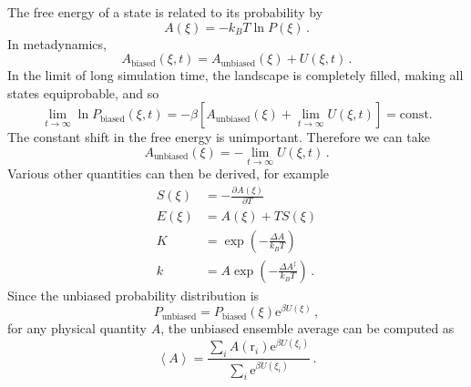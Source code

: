 \documentclass{article}
\theoremstyle{plain}\theoremheaderfont{\normalfont\itshape}\theorembodyfont{\rmfamily}\theoremseparator{.}\newtheorem*{rem}{Remark}\newtheorem*{ex}{Example}\newtheorem*{proof}{Proof}\newtheorem*{altp}{Alternative proof}
\theoremstyle{plain}\theoremheaderfont{\normalfont\bfseries}\theorembodyfont{\rmfamily}\theoremseparator{.}\newtheorem{thm}{Theorem}[section]\newtheorem{lem}[thm]{Lemma}\newtheorem{prop}[thm]{Proposition}\newtheorem*{cor}{Corollary}\newtheorem{defn}[thm]{Definition}\newtheorem{clm}[thm]{Claim}\newtheorem{clminproof}{Claim}\newtheorem{alg}[thm]{Algorithm}\newtheorem{hyp}[thm]{Hypothesis}\newtheorem{law}[thm]{Law}
\theoremstyle{break}\theoremheaderfont{\normalfont\itshape}\theorembodyfont{\rmfamily}\theoremseparator{.\medskip}\newtheorem*{proofskip}{Proof}\newtheorem*{exs}{Examples}\newtheorem*{rems}{Remarks}
\theoremstyle{break}\theoremheaderfont{\normalfont\bfseries}\theorembodyfont{\rmfamily}\theoremseparator{.\medskip}\newtheorem{lemskip}[thm]{Lemma}\newtheorem{defnskip}[thm]{Definition}\newtheorem{propskip}[thm]{Proposition}\newtheorem{thmskip}[thm]{Theorem}
\numberwithin{equation}{section}
\newcommand{\ee}{\mathrm{e}}
\newcommand{\pdv}[3][]{\frac{\partial^{#1} #2}{{\partial #3}^{#1}}}
\newcommand{\eval}[1]{\left\langle #1 \right\rangle}
\newcommand{\vb}[1]{\bm{\mathrm{#1}}}
\begin{document}
    The free energy of a state is related to its probability by
    \begin{equation}
        A(\xi)=-k_B T\ln P(\xi)\,.
    \end{equation}
    In metadynamics,
    \begin{equation}
        A_{\text{biased}}(\xi,t)=A_{\text{unbiased}}(\xi)+U(\xi,t)\,.
    \end{equation}
    In the limit of long simulation time, the landscape is completely filled, making all states equiprobable, and so
    \begin{equation}
        \lim_{t\to\infty}\ln P_{\text{biased}}(\xi,t)=-\beta\left[A_{\text{unbiased}}(\xi)+\lim_{t\to\infty} U(\xi,t)\right]=\text{const.}
    \end{equation}
    The constant shift in the free energy is unimportant. Therefore we can take
    \begin{equation}
        A_{\text{unbiased}}(\xi)=-\lim_{t\to\infty}U(\xi,t)\,.
    \end{equation}
    Various other quantities can then be derived, for example
    \begin{align}
        S(\xi)&=-\pdv{A(\xi)}{T}\\
        E(\xi)&=A(\xi)+TS(\xi)\\
        K&=\exp\left(-\frac{\Delta A}{k_B T}\right)\\
        k&=A\exp\left(-\frac{\Delta A^\ddagger}{k_B T}\right)\,.
    \end{align}
    Since the unbiased probability distribution is
    \begin{equation}
        P_{\text{unbiased}}=P_{\text{biased}}(\xi)\ee^{\beta U(\xi)}\,,
    \end{equation}
    for any physical quantity \(A\), the unbiased ensemble average can be computed as
    \begin{equation}
        \eval{A}=\frac{\sum_i A(\vb{r}_i)\ee^{\beta U(\xi_i)}}{\sum_i \ee^{\beta U(\xi_i)}}\,.
    \end{equation}
\end{document}

